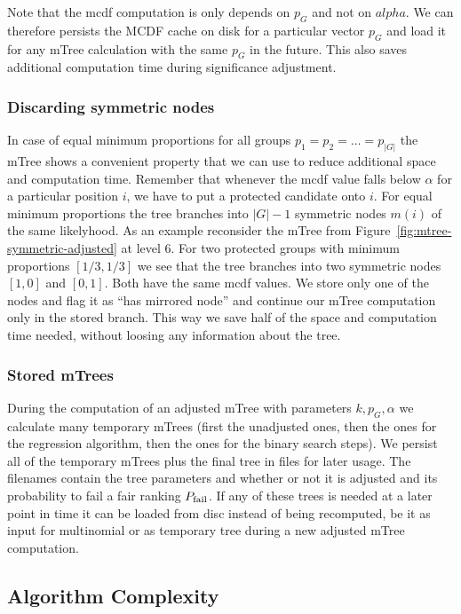 Note that the mcdf computation is only depends on $p_G$ and not on $alpha$.
%
We can therefore persists the MCDF cache on disk for a particular vector $p_G$ and load it for any mTree calculation with the same $p_G$ in the future.
%
This also saves additional computation time during significance adjustment.

\subsubsection{Discarding symmetric nodes}
\label{subsubsec:discarding-symmetric-nodes}
In case of equal minimum proportions for all groups $p_1 = p_2 = \ldots = p_|G|$ the mTree shows a convenient property that we can use to reduce additional space and computation time.
%
Remember that whenever the mcdf value falls below $\alpha$ for a particular position $i$, we have to put a protected candidate onto $i$.
%
For equal minimum proportions the tree branches into $|G| - 1$ symmetric nodes $m(i)$ of the same likelyhood.
%
As an example reconsider the mTree from Figure~\ref{fig:mtree-symmetric-adjusted} at level 6.
%
For two protected groups with minimum proportions $[1/3, 1/3]$ we see that the tree branches into two symmetric nodes $[1, 0]$ and $[0,1]$.
%
Both have the same mcdf values.
%
We store only one of the nodes and flag it as ``has mirrored node'' and continue our mTree computation only in the stored branch.
%
This way we save half of the space and computation time needed, without loosing any information about the tree.

\subsubsection{Stored mTrees}
\label{subsubsec:stored-mtrees}
During the computation of an adjusted mTree with parameters $k,p_G , \alpha$ we calculate many temporary mTrees (first the unadjusted ones, then the ones for the regression algorithm, then the ones for the binary search steps).
%
We persist all of the temporary mTrees plus the final tree in files for later usage.
%
The filenames contain the tree parameters and whether or not it is adjusted and its probability to fail a fair ranking $P_{\operatorname{fail}}$.
%
If any of these trees is needed at a later point in time it can be loaded from disc instead of being recomputed, be it as input for multinomial \algoFAIR or as temporary tree during a new adjusted mTree computation.


\subsection{Algorithm Complexity}\label{subsec:algorithm-complexity}

